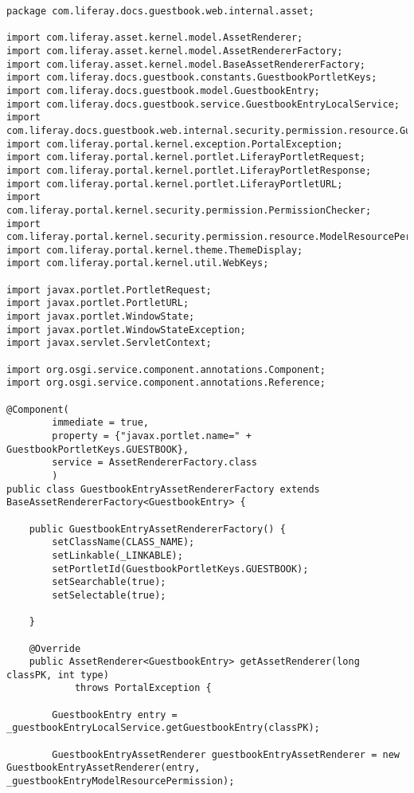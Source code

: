 \begin{verbatim}
package com.liferay.docs.guestbook.web.internal.asset;

import com.liferay.asset.kernel.model.AssetRenderer;
import com.liferay.asset.kernel.model.AssetRendererFactory;
import com.liferay.asset.kernel.model.BaseAssetRendererFactory;
import com.liferay.docs.guestbook.constants.GuestbookPortletKeys;
import com.liferay.docs.guestbook.model.GuestbookEntry;
import com.liferay.docs.guestbook.service.GuestbookEntryLocalService;
import com.liferay.docs.guestbook.web.internal.security.permission.resource.GuestbookEntryPermission;
import com.liferay.portal.kernel.exception.PortalException;
import com.liferay.portal.kernel.portlet.LiferayPortletRequest;
import com.liferay.portal.kernel.portlet.LiferayPortletResponse;
import com.liferay.portal.kernel.portlet.LiferayPortletURL;
import com.liferay.portal.kernel.security.permission.PermissionChecker;
import com.liferay.portal.kernel.security.permission.resource.ModelResourcePermission;
import com.liferay.portal.kernel.theme.ThemeDisplay;
import com.liferay.portal.kernel.util.WebKeys;

import javax.portlet.PortletRequest;
import javax.portlet.PortletURL;
import javax.portlet.WindowState;
import javax.portlet.WindowStateException;
import javax.servlet.ServletContext;

import org.osgi.service.component.annotations.Component;
import org.osgi.service.component.annotations.Reference;

@Component(
        immediate = true,
        property = {"javax.portlet.name=" + GuestbookPortletKeys.GUESTBOOK},
        service = AssetRendererFactory.class
        )
public class GuestbookEntryAssetRendererFactory extends BaseAssetRendererFactory<GuestbookEntry> {

    public GuestbookEntryAssetRendererFactory() {
        setClassName(CLASS_NAME);
        setLinkable(_LINKABLE);
        setPortletId(GuestbookPortletKeys.GUESTBOOK);
        setSearchable(true);
        setSelectable(true);

    }

    @Override
    public AssetRenderer<GuestbookEntry> getAssetRenderer(long classPK, int type)
            throws PortalException {

        GuestbookEntry entry = _guestbookEntryLocalService.getGuestbookEntry(classPK);

        GuestbookEntryAssetRenderer guestbookEntryAssetRenderer = new GuestbookEntryAssetRenderer(entry, _guestbookEntryModelResourcePermission);


\end{verbatim}
